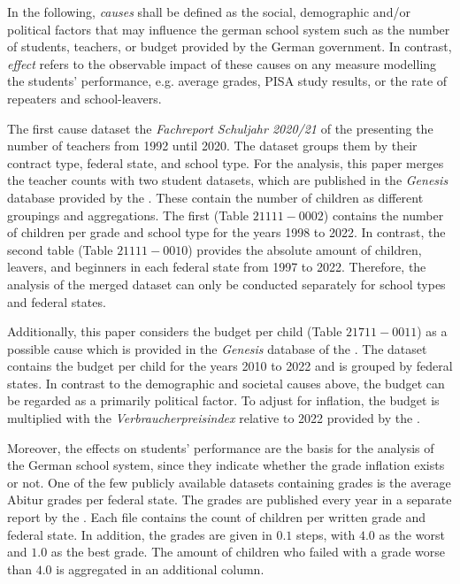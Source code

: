 In the following, \emph{causes} shall be defined as the social, demographic and/or political factors that may influence the german school system such as the number of students, teachers, or budget provided by the German government. In contrast, \emph{effect} refers to the observable impact of these causes on any measure modelling the students' performance, e.g. average grades, PISA study results, or the rate of repeaters and school-leavers.

The first cause dataset the \textit{Fachreport Schuljahr 2020/21} of the \citeauthor{statistische_bundesamt_allgemeinbildende_2022} presenting the number of teachers from 1992 until 2020. The dataset groups them by their contract type, federal state, and school type. For the analysis, this paper merges the teacher counts with two student datasets, which are published in the \textit{Genesis} database provided by the \citeauthor{statistische_bundesamt_statistisches_2023}. These contain the number of children as different groupings and aggregations. The first (Table $21111-0002$) contains the number of children per grade and school type  for the years 1998 to 2022. In contrast, the second table (Table $21111-0010$) provides the absolute amount of children, leavers, and beginners in each federal state from 1997 to 2022. Therefore, the analysis of the merged dataset can only be conducted separately for school types and federal states.

Additionally, this paper considers the budget per child (Table $21711-0011$) as a possible cause which is provided in the \textit{Genesis} database of the \citeauthor{statistische_bundesamt_statistisches_2023}. The dataset contains the budget per child for the years 2010 to 2022 and is grouped by federal states. In contrast to the demographic and societal causes above, the budget can be regarded as a primarily political factor. To adjust for inflation, the budget is multiplied with the \textit{Verbraucherpreisindex} relative to 2022 provided by the \citeauthor{statistische_bundesamt_statistisches_2023}. 


Moreover, the effects on students' performance are the basis for the analysis of the German school system, since they indicate whether the grade inflation exists or not. One of the few publicly available datasets containing grades is the average Abitur grades per federal state. The grades are published every year in a separate report by the \citeauthor{kultusminister_konferenz_abiturnoten_nodate}. Each file contains the count of children per written grade and federal state. In addition, the grades are given in $0.1$ steps, with $4.0$ as the worst and $1.0$ as the best grade. The amount of children who failed with a grade worse than $4.0$ is aggregated in an additional column. 

